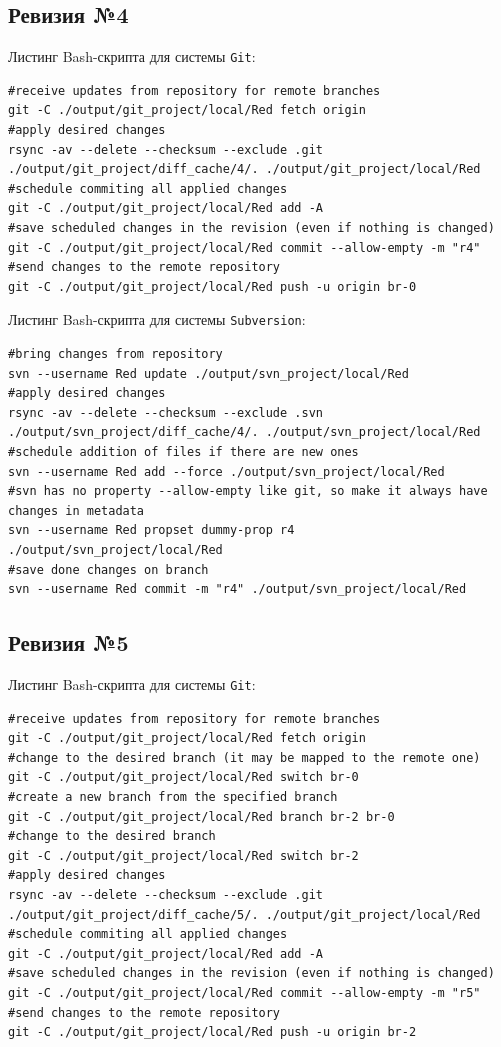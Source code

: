 \subsection{Ревизия №4}

Листинг Bash-скрипта для системы \texttt{Git}:
\begin{lstlisting}
#receive updates from repository for remote branches
git -C ./output/git_project/local/Red fetch origin
#apply desired changes
rsync -av --delete --checksum --exclude .git ./output/git_project/diff_cache/4/. ./output/git_project/local/Red
#schedule commiting all applied changes
git -C ./output/git_project/local/Red add -A
#save scheduled changes in the revision (even if nothing is changed)
git -C ./output/git_project/local/Red commit --allow-empty -m "r4"
#send changes to the remote repository
git -C ./output/git_project/local/Red push -u origin br-0
\end{lstlisting}

Листинг Bash-скрипта для системы \texttt{Subversion}:
\begin{lstlisting}
#bring changes from repository
svn --username Red update ./output/svn_project/local/Red
#apply desired changes
rsync -av --delete --checksum --exclude .svn ./output/svn_project/diff_cache/4/. ./output/svn_project/local/Red
#schedule addition of files if there are new ones
svn --username Red add --force ./output/svn_project/local/Red
#svn has no property --allow-empty like git, so make it always have changes in metadata
svn --username Red propset dummy-prop r4 ./output/svn_project/local/Red
#save done changes on branch
svn --username Red commit -m "r4" ./output/svn_project/local/Red
\end{lstlisting}


\subsection{Ревизия №5}

Листинг Bash-скрипта для системы \texttt{Git}:
\begin{lstlisting}
#receive updates from repository for remote branches
git -C ./output/git_project/local/Red fetch origin
#change to the desired branch (it may be mapped to the remote one)
git -C ./output/git_project/local/Red switch br-0
#create a new branch from the specified branch
git -C ./output/git_project/local/Red branch br-2 br-0
#change to the desired branch
git -C ./output/git_project/local/Red switch br-2
#apply desired changes
rsync -av --delete --checksum --exclude .git ./output/git_project/diff_cache/5/. ./output/git_project/local/Red
#schedule commiting all applied changes
git -C ./output/git_project/local/Red add -A
#save scheduled changes in the revision (even if nothing is changed)
git -C ./output/git_project/local/Red commit --allow-empty -m "r5"
#send changes to the remote repository
git -C ./output/git_project/local/Red push -u origin br-2
\end{lstlisting}

